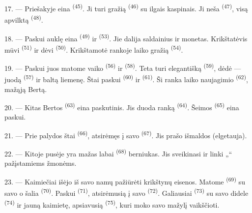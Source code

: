 \VUsaut{5.0mm}
\VUsaut{4.0mm}

17. --- Priešakyje eina  \textsuperscript{(45)}. Ji turi gražią
 \textsuperscript{(46)} su ilgais kaspinais. Ji neša 
\textsuperscript{(47)}, visą apvilktą  \textsuperscript{(48)}.

18. --- Paskui auklę eina  \textsuperscript{(49)} ir
 \textsuperscript{(53)}. Jie dalija saldainius ir monetas.
Krikštatėvis mūvi  \textsuperscript{(51)} ir dėvi
 \textsuperscript{(50)}. Krikštamotė rankoje laiko gražią
 \textsuperscript{(54)}.

19. --- Paskui juos matome vaiko  \textsuperscript{(56)} ir
 \textsuperscript{(58)}. Teta turi elegantišką 
\textsuperscript{(59)}, dėdė --- juodą  \textsuperscript{(57)} ir
baltą liemenę. Štai paskui  \textsuperscript{(60)} ir
 \textsuperscript{(61)}. Ši ranka laiko naujagimio 
\textsuperscript{(62)}, mažąją Bertą.

20. --- Kitas Bertos  \textsuperscript{(63)} eina paskutinis. Jis
duoda ranką  \textsuperscript{(64)}. Šeimos 
\textsuperscript{(65)} eina paskui.

\VUsaut{4.6mm}
\VUsaut{3.4mm}

21. --- Prie palydos štai  \textsuperscript{(66)}, atsirėmęs į savo
 \textsuperscript{(67)}. Jis prašo išmaldos (elgetauja).

22. --- Kitoje pusėje yra mažas labai  \textsuperscript{(68)}
berniukas. Jis sveikinasi ir linki „“ pažįstamiems žmonėms.

23. --- Kaimiečiai išėjo iš savo namų pažiūrėti krikštynų eisenos. Matome
 \textsuperscript{(69)} su savo  o
šalia  \textsuperscript{(70)}. Paskui 
\textsuperscript{(71)}, atsirėmusią į savo  \textsuperscript{(72)}.
Galiausiai  \textsuperscript{(73)} su savo didele  \textsuperscript{(74)} ir jauną kaimietę, apsiavusią 
\textsuperscript{(75)}, kuri moko savo mažylį vaikščioti.

